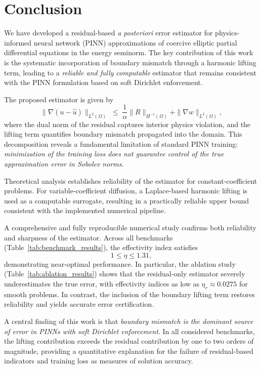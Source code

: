 \section{Conclusion}\label{sec:conclusion}

We have developed a residual-based \emph{a posteriori} error estimator for
physics-informed neural network (PINN) approximations of coercive elliptic
partial differential equations in the energy seminorm. The key contribution
of this work is the systematic incorporation of boundary mismatch through
a harmonic lifting term, leading to a \emph{reliable and fully computable}
estimator that remains consistent with the PINN formulation based on soft
Dirichlet enforcement.

The proposed estimator is given by
\[
\|\nabla(u - \hat{u})\|_{L^2(\Omega)}
\;\le\;
\frac{1}{\alpha}\|R\|_{H^{-1}(\Omega)}
+
\|\nabla w\|_{L^2(\Omega)},
\]
where the dual norm of the residual captures interior physics violation,
and the lifting term quantifies boundary mismatch propagated into the domain.
This decomposition reveals a fundamental limitation of standard PINN training:
\emph{minimization of the training loss does not guarantee control of the
true approximation error in Sobolev norms}.

Theoretical analysis establishes reliability of the estimator for
constant-coefficient problems. For variable-coefficient diffusion,
a Laplace-based harmonic lifting is used as a computable surrogate,
resulting in a practically reliable upper bound consistent with the
implemented numerical pipeline.

A comprehensive and fully reproducible numerical study confirms both
reliability and sharpness of the estimator. Across all benchmarks
(Table~\ref{tab:benchmark_results}), the effectivity index satisfies
\[
1 \le \eta \le 1.31,
\]
demonstrating near-optimal performance. In particular, the ablation study
(Table~\ref{tab:ablation_results}) shows that the residual-only estimator
severely underestimates the true error, with effectivity indices as low as
$\eta_r \approx 0.0275$ for smooth problems. In contrast, the inclusion of
the boundary lifting term restores reliability and yields accurate error
certification.

A central finding of this work is that \emph{boundary mismatch is the dominant
source of error in PINNs with soft Dirichlet enforcement}. In all considered
benchmarks, the lifting contribution exceeds the residual contribution by
one to two orders of magnitude, providing a quantitative explanation for the
failure of residual-based indicators and training loss as measures of
solution accuracy.

